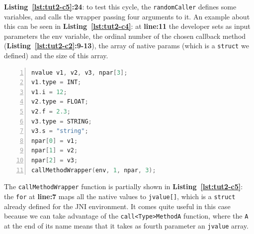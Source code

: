\documentclass[a4paper,10pt]{article}
\newcommand{\keyword}[1]{\texttt{#1}}
\newcommand{\refl}[1]{\textbf{Listing~\ref{#1}}}
\begin{document}
\begin{multicols}{2}
\refl{lst:tut2-c5}\textbf{:24}: to test this cycle, the \keyword{randomCaller}
defines some variables, and calls the wrapper passing four arguments to it. An
example about this can be seen in \refl{lst:tut2-c4}: at \textbf{line:11} the
developer sets as input parameters the env variable, the ordinal number of the
chosen callback method (\refl{lst:tut2-c2}\textbf{:9-13}), the array of native
params (which is a \keyword{struct} we defined) and the size of this array.
\begin{lstlisting}[language=C,
		   columns=fullflexible,
		   showstringspaces=false,
		   xleftmargin=15pt,
		   frame = l,
		   numbers=left,
		   commentstyle=\color{gray}\upshape,
		   caption=Part of tutorial2.c - method calls in randomCaller(),
		   label=lst:tut2-c4]
nvalue v1, v2, v3, npar[3];
v1.type = INT;
v1.i = 12;
v2.type = FLOAT;
v2.f = 2.3;
v3.type = STRING;
v3.s = "string";
npar[0] = v1;
npar[1] = v2;
npar[2] = v3;
callMethodWrapper(env, 1, npar, 3);
\end{lstlisting}
The \keyword{callMethodWrapper} function is partially shown in
\refl{lst:tut2-c5}: the \keyword{for} at \textbf{line:7} maps all the native
values to \keyword{jvalue[]}, which is a \keyword{struct} already defined for
the JNI environment. It comes quite useful in this case because we can take
advantage of the \keyword{call<Type>MethodA} function, where the \keyword{A}
at the end of its name means that it takes as fourth parameter an
\keyword{jvalue} array.


\end{multicols}
\end{document}
